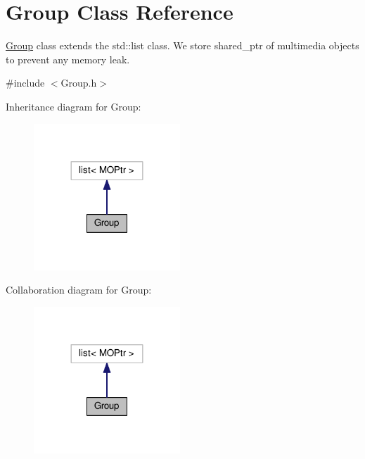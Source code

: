 \hypertarget{classGroup}{}\section{Group Class Reference}
\label{classGroup}


\hyperlink{classGroup}{Group} class extends the std\+::list class. We store shared\+\_\+ptr of multimedia objects to prevent any memory leak.  




{\ttfamily \#include $<$Group.\+h$>$}



Inheritance diagram for Group\+:
\nopagebreak
\begin{figure}[H]
\begin{center}
\leavevmode
\includegraphics[width=156pt]{classGroup__inherit__graph}
\end{center}
\end{figure}


Collaboration diagram for Group\+:
\nopagebreak
\begin{figure}[H]
\begin{center}
\leavevmode
\includegraphics[width=156pt]{classGroup__coll__graph}
\end{center}
\end{figure}
